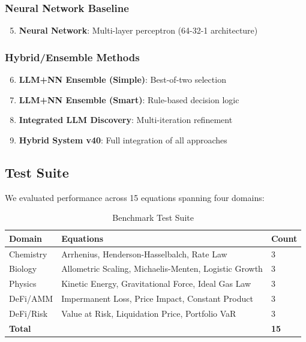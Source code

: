 \documentclass[11pt,a4paper]{article}
\begin{document}
\subsubsection{Neural Network Baseline}

\begin{enumerate}
    \setcounter{enumi}{4}
    \item \textbf{Neural Network}: Multi-layer perceptron (64-32-1 architecture)
\end{enumerate}

\subsubsection{Hybrid/Ensemble Methods}

\begin{enumerate}
    \setcounter{enumi}{5}
    \item \textbf{LLM+NN Ensemble (Simple)}: Best-of-two selection
    \item \textbf{LLM+NN Ensemble (Smart)}: Rule-based decision logic
    \item \textbf{Integrated LLM Discovery}: Multi-iteration refinement
    \item \textbf{Hybrid System v40}: Full integration of all approaches
\end{enumerate}

\subsection{Test Suite}

We evaluated performance across 15 equations spanning four domains:

\begin{table}[h]
\centering
\caption{Benchmark Test Suite}
\begin{tabular}{lll}
\toprule
\textbf{Domain} & \textbf{Equations} & \textbf{Count} \\
\midrule
Chemistry & Arrhenius, Henderson-Hasselbalch, Rate Law & 3 \\
Biology & Allometric Scaling, Michaelis-Menten, Logistic Growth & 3 \\
Physics & Kinetic Energy, Gravitational Force, Ideal Gas Law & 3 \\
DeFi/AMM & Impermanent Loss, Price Impact, Constant Product & 3 \\
DeFi/Risk & Value at Risk, Liquidation Price, Portfolio VaR & 3 \\
\midrule
\textbf{Total} & & \textbf{15} \\
\bottomrule
\end{tabular}
\end{table}
\end{document}
